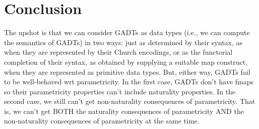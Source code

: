 \documentclass[acmsmall,screen,review,anonymous]{acmart}
\theoremstyle{definition}
\begin{document}
\section{Conclusion}

The upshot is that we can consider GADTs as data types (i.e., we can
compute the semantics of GADTs) in two ways: just as determined by
their syntax, as when they are represented by their Church encodings,
or as the functorial completion of their syntax, as obtained by
supplying a suitable map construct, when they are represented as
primitive data types. But, either way, GADTs fail to be well-behaved
wrt parametricity. In the first case, GADTs don't have fmaps so their
parametricity properties can't include naturality properties. In the
second case, we still can't get non-naturality consequences of
parametricity. That is, we can't get BOTH the naturality consequences
of parametricity AND the non-naturality consequences of parametricity
at the same time.




\end{document}
